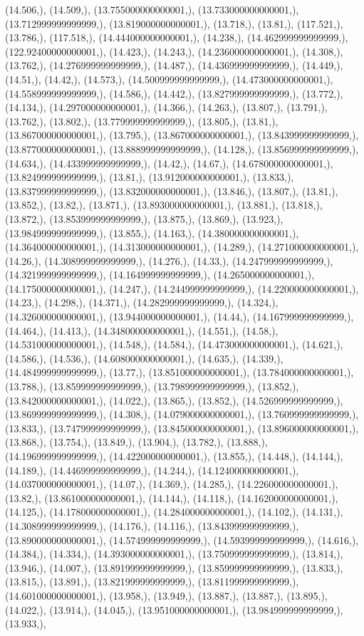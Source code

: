 \documentclass{article}
\begin{document}
(14.506,), (14.509,), (13.755000000000001,), (13.733000000000001,), (13.712999999999999,), (13.819000000000001,), (13.718,), (13.81,), (117.521,), (13.786,), (117.518,), (14.444000000000001,), (14.238,), (14.462999999999999,), (122.92400000000001,), (14.423,), (14.243,), (14.236000000000001,), (14.308,), (13.762,), (14.276999999999999,), (14.487,), (14.436999999999999,), (14.449,), (14.51,), (14.42,), (14.573,), (14.500999999999999,), (14.473000000000001,), (14.558999999999999,), (14.586,), (14.442,), (13.827999999999999,), (13.772,), (14.134,), (14.297000000000001,), (14.366,), (14.263,), (13.807,), (13.791,), (13.762,), (13.802,), (13.779999999999999,), (13.805,), (13.81,), (13.867000000000001,), (13.795,), (13.867000000000001,), (13.843999999999999,), (13.877000000000001,), (13.888999999999999,), (14.128,), (13.856999999999999,), (14.634,), (14.433999999999999,), (14.42,), (14.67,), (14.678000000000001,), (13.824999999999999,), (13.81,), (13.912000000000001,), (13.833,), (13.837999999999999,), (13.832000000000001,), (13.846,), (13.807,), (13.81,), (13.852,), (13.82,), (13.871,), (13.893000000000001,), (13.881,), (13.818,), (13.872,), (13.853999999999999,), (13.875,), (13.869,), (13.923,), (13.984999999999999,), (13.855,), (14.163,), (14.380000000000001,), (14.364000000000001,), (14.313000000000001,), (14.289,), (14.271000000000001,), (14.26,), (14.308999999999999,), (14.276,), (14.33,), (14.247999999999999,), (14.321999999999999,), (14.164999999999999,), (14.265000000000001,), (14.175000000000001,), (14.247,), (14.244999999999999,), (14.220000000000001,), (14.23,), (14.298,), (14.371,), (14.282999999999999,), (14.324,), (14.326000000000001,), (13.944000000000001,), (14.44,), (14.167999999999999,), (14.464,), (14.413,), (14.348000000000001,), (14.551,), (14.58,), (14.531000000000001,), (14.548,), (14.584,), (14.473000000000001,), (14.621,), (14.586,), (14.536,), (14.608000000000001,), (14.635,), (14.339,), (14.484999999999999,), (13.77,), (13.851000000000001,), (13.784000000000001,), (13.788,), (13.859999999999999,), (13.798999999999999,), (13.852,), (13.842000000000001,), (14.022,), (13.865,), (13.852,), (14.526999999999999,), (13.869999999999999,), (14.308,), (14.079000000000001,), (13.760999999999999,), (13.833,), (13.747999999999999,), (13.845000000000001,), (13.896000000000001,), (13.868,), (13.754,), (13.849,), (13.904,), (13.782,), (13.888,), (14.196999999999999,), (14.422000000000001,), (13.855,), (14.448,), (14.144,), (14.189,), (14.446999999999999,), (14.244,), (14.124000000000001,), (14.037000000000001,), (14.07,), (14.369,), (14.285,), (14.226000000000001,), (13.82,), (13.861000000000001,), (14.144,), (14.118,), (14.162000000000001,), (14.125,), (14.178000000000001,), (14.284000000000001,), (14.102,), (14.131,), (14.308999999999999,), (14.176,), (14.116,), (13.843999999999999,), (13.890000000000001,), (14.574999999999999,), (14.593999999999999,), (14.616,), (14.384,), (14.334,), (14.393000000000001,), (13.750999999999999,), (13.814,), (13.946,), (14.007,), (13.891999999999999,), (13.859999999999999,), (13.833,), (13.815,), (13.891,), (13.821999999999999,), (13.811999999999999,), (14.601000000000001,), (13.958,), (13.949,), (13.887,), (13.887,), (13.895,), (14.022,), (13.914,), (14.045,), (13.951000000000001,), (13.984999999999999,), (13.933,), 
\end{document}
